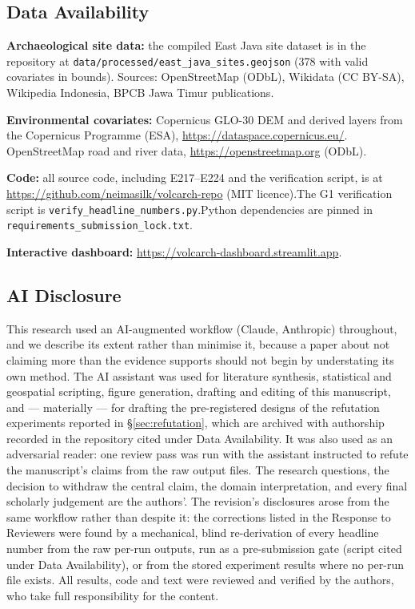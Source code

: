 \documentclass[12pt]{article}
\begin{document}
\subsection*{Data Availability}

\textbf{Archaeological site data:} the compiled East Java site dataset is in the repository at \texttt{data/processed/east\_java\_sites.geojson} (378 with valid covariates in bounds). Sources: OpenStreetMap (ODbL), Wikidata (CC BY-SA), Wikipedia Indonesia, BPCB Jawa Timur publications.

\textbf{Environmental covariates:} Copernicus GLO-30 DEM and derived layers from the Copernicus Programme (ESA), \url{https://dataspace.copernicus.eu/}. OpenStreetMap road and river data, \url{https://openstreetmap.org} (ODbL).

\textbf{Code:} all source code, including E217--E224 and the verification script, is at \url{https://github.com/neimasilk/volcarch-repo} (MIT licence).\newline The G1 verification script is \texttt{verify\_headline\_numbers.py}.\newline Python dependencies are pinned in \texttt{requirements\_submission\_lock.txt}.

\textbf{Interactive dashboard:} \url{https://volcarch-dashboard.streamlit.app}.

\subsection*{AI Disclosure}

This research used an AI-augmented workflow (Claude, Anthropic) throughout, and we describe its extent rather than minimise it, because a paper about not claiming more than the evidence supports should not begin by understating its own method.
The AI assistant was used for literature synthesis, statistical and geospatial scripting, figure generation, drafting and editing of this manuscript, and --- materially --- for drafting the pre-registered designs of the refutation experiments reported in \S\ref{sec:refutation}, which are archived with authorship recorded in the repository cited under Data Availability.
It was also used as an adversarial reader: one review pass was run with the assistant instructed to refute the manuscript's claims from the raw output files.
The research questions, the decision to withdraw the central claim, the domain interpretation, and every final scholarly judgement are the authors'.
The revision's disclosures arose from the same workflow rather than despite it: the corrections listed in the Response to Reviewers were found by a mechanical, blind re-derivation of every headline number from the raw per-run outputs, run as a pre-submission gate (script cited under Data Availability), or from the stored experiment results where no per-run file exists.
All results, code and text were reviewed and verified by the authors, who take full responsibility for the content.


\end{document}
